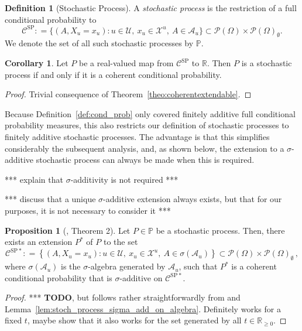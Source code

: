 \documentclass[10pt]{paper}
\theoremstyle{definition}
\newtheorem{proposition}[theorem]{Proposition}
\newtheorem{corollary}[theorem]{Corollary}
\newtheorem{definition}{Definition}
\newcommand{\reals}{\mathbb{R}}
\newcommand{\realsnonneg}{\reals_{\geq 0}}
\newcommand{\states}{\mathcal{X}}
\newcommand{\paths}{\Omega}
\newcommand{\power}{\mathcal{P}(\paths)}
\newcommand{\nonemptypower}{\power_{\emptyset}}
\newcommand{\processes}{\mathbb{P}}
\newcommand{\coloneqq}{:\!=}
\begin{document}
\begin{definition}[Stochastic Process]\label{def:stoch_process}
A \emph{stochastic process} is the restriction of a full conditional probability to
\begin{equation*}
\mathcal{C}^\mathrm{SP}\coloneqq\big\{
(A,X_u=x_u)
\colon
u\in\mathcal{U},~x_u\in\states^u,~A\in\mathcal{A}_u\big\}\subset\power\times\nonemptypower.
\end{equation*}
We denote the set of all such stochastic processes by $\processes$.
\end{definition}

\begin{corollary}\label{corol:processiffcoherent}
Let $P$ be a real-valued map from $\mathcal{C}^\mathrm{SP}$ to $\reals$. Then $P$ is a stochastic process if and only if it is a coherent conditional probability.
\end{corollary}
\begin{proof}
Trivial consequence of Theorem~\ref{theo:coherentextendable}.
\end{proof}

Because Definition~\ref{def:cond_prob} only covered finitely additive full conditional probability measures, this also restricts our definition of stochastic processes to finitely additive stochastic processes. The advantage is that this simplifies considerably the subsequent analysis, and, as shown below, the extension to a $\sigma$-additive stochastic process can always be made when this is required.

*** explain that $\sigma$-additivity is not required ***

*** discuss that a unique $\sigma$-additive extension always exists, but that for our purposes, it is not necessary to consider it ***

\begin{proposition}[\cite{berti2002coherent}, Theorem 2]
Let $P\in\processes$ be a stochastic process. Then, there exists an extension $P^*$ of $P$ to the set
\begin{equation*}
\mathcal{C}^{\mathrm{SP}*} \coloneqq \left\{(A,X_u=x_u)\colon
u\in\mathcal{U},~x_u\in\states^u,~A\in\sigma(\mathcal{A}_u)
\right\}\subset\power\times\nonemptypower\,,
\end{equation*}
where $\sigma(\mathcal{A}_u)$ is the $\sigma$-algebra generated by $\mathcal{A}_u$, such that $P^*$ is a coherent conditional probability that is $\sigma$-additive on $\mathcal{C}^{\mathrm{SP}*}$.
\end{proposition}
\begin{proof}
*** {\bf TODO}, but follows rather straightforwardly from \cite[Theorem 2]{berti2002coherent} and Lemma~\ref{lem:stoch_process_sigma_add_on_algebra}. Definitely works for a fixed $t$, maybe show that it also works for the set generated by all $t\in\realsnonneg$.
\end{proof}
\end{document}

